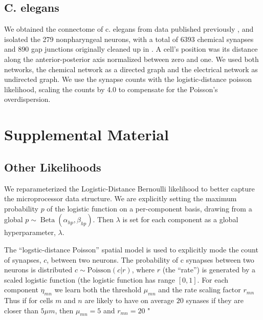 \documentclass{article}
\begin{document}
\subsection*{C. elegans}

We obtained the connectome of c. elegans from data published
previously \autocite{Varshney2011}, and isolated the 279 nonpharyngeal
neurons, with a total of 6393 chemical synapses and 890 gap junctions
originally cleaned up in \autocite{Chen2006}. A cell's position was
its distance along the anterior-posterior axis normalized between zero
and one. We used both networks, the chemical network as a directed
graph and the electrical network as undirected graph. We use the
synapse counts with the logistic-distance poisson likelihood, scaling
the counts by 4.0 to compensate for the Poisson's overdispersion.



\newpage
\section*{Supplemental Material}

\subsection*{Other Likelihoods}
\label{supp:otherlikelihoods}

We reparameterized the Logistic-Distance Bernoulli likelihood to
better capture the microprocessor data structure. We are explicitly
setting the maximum probability $p$ of the logistic function on a
per-component basis, drawing from a global $p \sim \operatorname{Beta}(\alpha_{hp},
\beta_{hp})$. Then $\lambda$ is set for each component as a global
hyperparameter, $\lambda$.

The ``logstic-distance Poisson'' spatial model is used to explicitly
mode the count of synapses, $c$, between two neurons. The probability
of c synapses between two neurons is distributed $c \sim
\textrm{Poisson}(c | r)$, where $r$ (the ``rate'') is generated by a
scaled logistic function (the logistic function has range $[0,
1]$. For each component $\eta_{mn}$ we learn both the threshold
$\mu_{mn}$ and the rate scaling factor $r_{mn}$ Thus if for cells $m$
and $n$ are likely to have on average $20$ synases if they are closer
than $5 \mu m$, then $\mu_{mn} = 5$ and $r_{mn} = 20$ "
\end{document}
